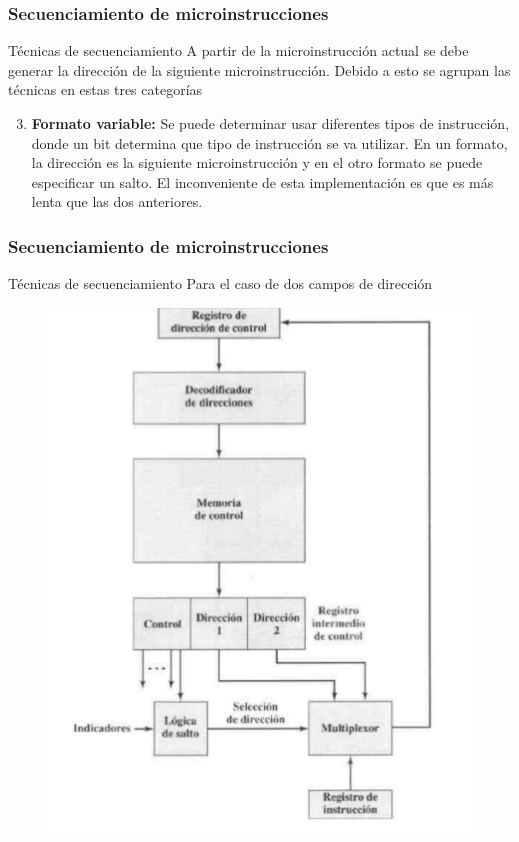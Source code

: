 \documentclass{beamer}
\begin{document}
\begin{frame}
	\frametitle{Secuenciamiento de microinstrucciones}
	\begin{block}{Técnicas de secuenciamiento}
	A partir de la microinstrucción actual se debe generar la dirección de la siguiente microinstrucción. Debido a esto se agrupan las técnicas en estas tres categorías
	\begin{enumerate} \setcounter{enumi}{2}
		\item \textbf{Formato variable:} Se puede determinar usar diferentes tipos de instrucción, donde un bit determina que tipo de instrucción se va utilizar. En un formato, la dirección es la siguiente microinstrucción y en el otro formato se puede especificar un salto. El inconveniente de esta implementación es que es más lenta que las dos anteriores.
	\end{enumerate}
	\end{block}	
\end{frame}

\begin{frame}
	\frametitle{Secuenciamiento de microinstrucciones}
	\begin{block}{Técnicas de secuenciamiento}
	Para el caso de dos campos de dirección
	\end{block}	
	\begin{figure}[H]
		\centering
		\includegraphics[scale=0.3]{imagenes/doscampos.png} 
	\end{figure}
\end{frame}
\end{document}

